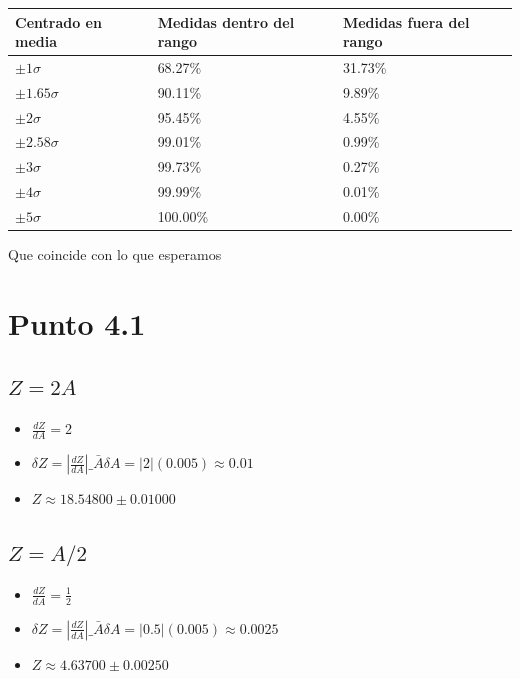 \documentclass[12pt]{exam}
\begin{document}
\begin{tabular}{lll}
  \hline
  Centrado en media   & Medidas dentro del rango   & Medidas fuera del rango   \\
  \hline
  $\pm 1 \sigma$        & 68.27\%                     & 31.73\%                    \\
  $\pm 1.65 \sigma$     & 90.11\%                     & 9.89\%                     \\
  $\pm 2 \sigma$        & 95.45\%                     & 4.55\%                     \\
  $\pm 2.58 \sigma$     & 99.01\%                     & 0.99\%                     \\
  $\pm 3 \sigma$        & 99.73\%                     & 0.27\%                     \\
  $\pm 4 \sigma$        & 99.99\%                     & 0.01\%                     \\
  $\pm 5 \sigma$        & 100.00\%                    & 0.00\%                     \\
  \hline
\end{tabular}

Que coincide con lo que esperamos

\section{Punto 4.1}

\subsection{$Z = 2A$}
\begin{itemize}
\item $\frac{dZ}{dA} = 2$
\item $\delta Z = \left|\frac{dZ}{dA}\right|\_{\bar{A}} \delta A = |2|(0.005) \approx 0.01$
\item $Z \approx 18.54800 \pm 0.01000$
\end{itemize}
\vspace{0.5cm}

\subsection{$Z = A/2$}
\begin{itemize}
\item $\frac{dZ}{dA} = \frac{1}{2}$
\item $\delta Z = \left|\frac{dZ}{dA}\right|\_{\bar{A}} \delta A = |0.5|(0.005) \approx 0.0025$
\item $Z \approx 4.63700 \pm 0.00250$
\end{itemize}
\vspace{0.5cm}
\end{document}
